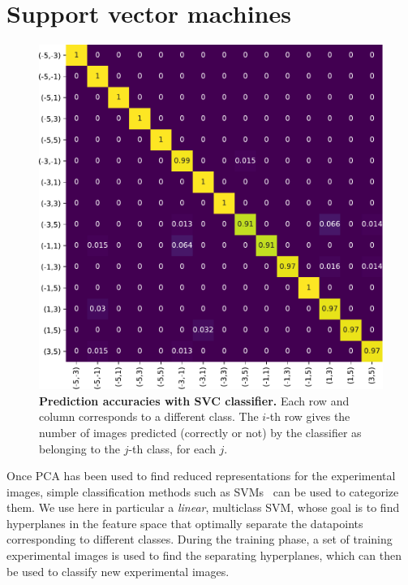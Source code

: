 \documentclass[
    floatfix, aps, pra, superscriptaddress,
	10pt, twocolumn,
    nofootinbib,
	tightenlines
]{revtex4-1}
\begin{document}
\section{Support vector machines}
\label{sec:SVMs}

\begin{figure}[t]
    \centering
    \includegraphics[width=\columnwidth]{truth_table_PCA+SVC.pdf}
    \caption{
        \textbf{Prediction accuracies with SVC classifier.}
        Each row and column corresponds to a different class.
        The $i$-th row gives the number of images predicted (correctly or not) by the classifier as belonging to the $j$-th class, for each $j$.
    }
    \label{si_fig:truth_SVC}
\end{figure}

Once \ac{PCA} has been used to find reduced representations for the experimental images, simple classification methods such as \acp{SVM}~\cite{hearst1998support,shawe2000support} can be used to categorize them.
We use here in particular a \emph{linear}, multiclass \ac{SVM}, whose goal is to find hyperplanes in the feature space that optimally separate the datapoints corresponding to different classes.
During the training phase, a set of training experimental images is used to find the separating hyperplanes, which can then be used to classify new experimental images.
\end{document}

